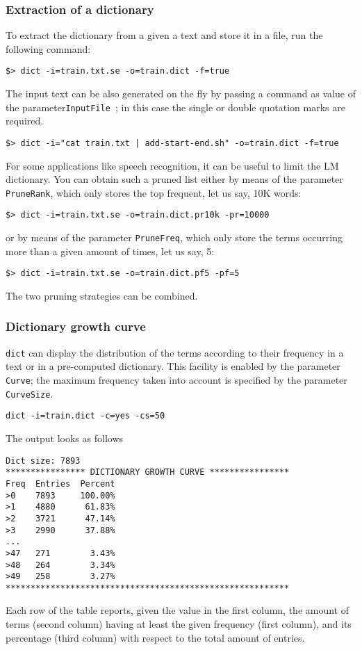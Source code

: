 \subsubsection{Extraction of a dictionary}
To extract the dictionary from a given a text and store it in a file, run the following command:

\begin{verbatim}
$> dict -i=train.txt.se -o=train.dict -f=true
\end{verbatim}

The input text can be also generated on the fly by passing a command as value of the parameter{\tt InputFile }; in this case the single or double quotation marks are required.  
\begin{verbatim}
$> dict -i="cat train.txt | add-start-end.sh" -o=train.dict -f=true
\end{verbatim}

\noindent
For some applications like speech recognition, it  can be useful to limit the LM dictionary.
You can obtain such a pruned list either by means of the parameter {\tt PruneRank}, which only stores the top frequent, let us say, 10K words:
\begin{verbatim}
$> dict -i=train.txt.se -o=train.dict.pr10k -pr=10000
\end{verbatim}

\noindent
or by means of the parameter {\tt PruneFreq}, which only store the terms occurring more than a given amount of times, let us say, 5:
\begin{verbatim}
$> dict -i=train.txt.se -o=train.dict.pf5 -pf=5
\end{verbatim}

\noindent
The two pruning strategies can be combined.



\subsubsection{Dictionary growth curve}
{\tt dict} can display the distribution of the terms according to their frequency in a text or in a pre-computed dictionary. This facility is enabled by the parameter {\tt Curve}; the maximum frequency taken into account is specified by the parameter {\tt CurveSize}.
 
\begin{verbatim}
dict -i=train.dict -c=yes -cs=50
\end{verbatim}

\noindent
The output looks as follows
\begin{verbatim}
Dict size: 7893
**************** DICTIONARY GROWTH CURVE ****************
Freq  Entries  Percent
>0    7893     100.00%
>1    4880      61.83%
>2    3721      47.14%
>3    2990      37.88%
...
>47   271        3.43%
>48   264        3.34%
>49   258        3.27%
*********************************************************
\end{verbatim}
\noindent
Each row of the table reports, given the value in the first column, the amount of terms (second column) having at least the given frequency (first column), and its percentage  (third column) with respect to the total amount of entries.



